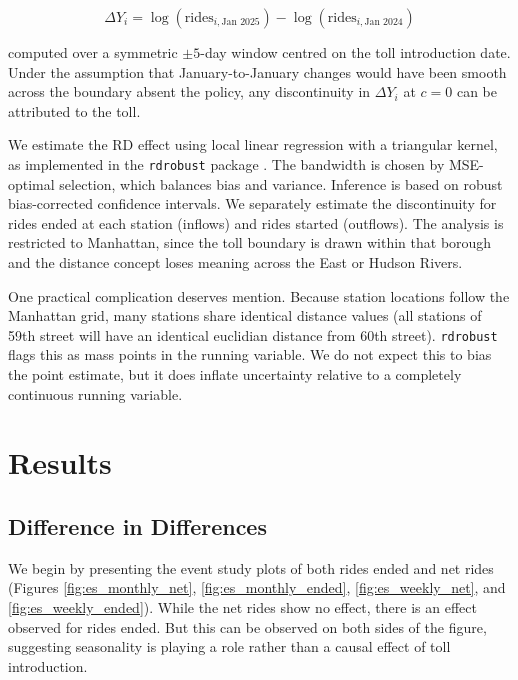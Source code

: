 \documentclass[10pt]{article}
\begin{document}
\begin{equation}
    \Delta Y_i = \log(\text{rides}_{i,\text{Jan 2025}}) - \log(\text{rides}_{i,\text{Jan 2024}})
\end{equation}

\noindent computed over a symmetric $\pm 5$-day window centred on the toll introduction date. Under the assumption that January-to-January changes would have been smooth across the boundary absent the policy, any discontinuity in $\Delta Y_i$ at $c = 0$ can be attributed to the toll.

We estimate the RD effect using local linear regression with a triangular kernel, as implemented in the \texttt{rdrobust} package \cite{Calonico2014}. The bandwidth is chosen by MSE-optimal selection, which balances bias and variance. Inference is based on robust bias-corrected confidence intervals. We separately estimate the discontinuity for rides ended at each station (inflows) and rides started (outflows). The analysis is restricted to Manhattan, since the toll boundary is drawn within that borough and the distance concept loses meaning across the East or Hudson Rivers.

One practical complication deserves mention. Because station locations follow the Manhattan grid, many stations share identical distance values (all stations of 59th street will have an identical euclidian distance from 60th street). \texttt{rdrobust} flags this as mass points in the running variable. We do not expect this to bias the point estimate, but it does inflate uncertainty relative to a completely continuous running variable.

\section{Results}

\subsection{Difference in Differences}

We begin by presenting the event study plots of both rides ended and net rides (Figures \ref{fig:es_monthly_net}, \ref{fig:es_monthly_ended}, \ref{fig:es_weekly_net}, and \ref{fig:es_weekly_ended}). While the net rides show no effect, there is an effect observed for rides ended. But this can be observed on both sides of the figure, suggesting seasonality is playing a role rather than a causal effect of toll introduction.
\end{document}
